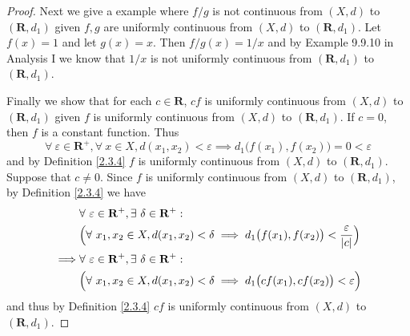 \begin{proof}
    Next we give a example where \(f / g\) is not continuous from \((X, d)\) to \((\mathbf{R}, d_1)\) given \(f, g\) are uniformly continuous from \((X, d)\) to \((\mathbf{R}, d_1)\).
    Let \(f(x) = 1\) and let \(g(x) = x\).
    Then \(f / g(x) = 1 / x\) and by Example 9.9.10 in Analysis I we know that \(1 / x\) is not uniformly continuous from \((\mathbf{R}, d_1)\) to \((\mathbf{R}, d_1)\).

    Finally we show that for each \(c \in \mathbf{R}\), \(cf\) is uniformly continuous from \((X, d)\) to \((\mathbf{R}, d_1)\) given \(f\) is uniformly continuous from \((X, d)\) to \((\mathbf{R}, d_1)\).
    If \(c = 0\), then \(f\) is a constant function.
    Thus
    \[
        \forall\ \varepsilon \in \mathbf{R}^+, \forall\ x \in X, d(x_1, x_2) < \varepsilon \implies d_1\big(f(x_1), f(x_2)\big) = 0 < \varepsilon
    \]
    and by Definition \ref{2.3.4} \(f\) is uniformly continuous from \((X, d)\) to \((\mathbf{R}, d_1)\).
    Suppose that \(c \neq 0\).
    Since \(f\) is uniformly continuous from \((X, d)\) to \((\mathbf{R}, d_1)\), by Definition \ref{2.3.4} we have
    \begin{align*}
                 & \forall\ \varepsilon \in \mathbf{R}^+, \exists\ \delta \in \mathbf{R}^+:                                                    \\
                 & \Big(\forall\ x_1, x_2 \in X, d(x_1, x_2) < \delta \implies d_1\big(f(x_1), f(x_2)\big) < \frac{\varepsilon}{\abs*{c}}\Big) \\
        \implies & \forall\ \varepsilon \in \mathbf{R}^+, \exists\ \delta \in \mathbf{R}^+:                                                    \\
                 & \Big(\forall\ x_1, x_2 \in X, d(x_1, x_2) < \delta \implies d_1\big(cf(x_1), cf(x_2)\big) < \varepsilon\Big)
    \end{align*}
    and thus by Definition \ref{2.3.4} \(cf\) is uniformly continuous from \((X, d)\) to \((\mathbf{R}, d_1)\).
\end{proof}